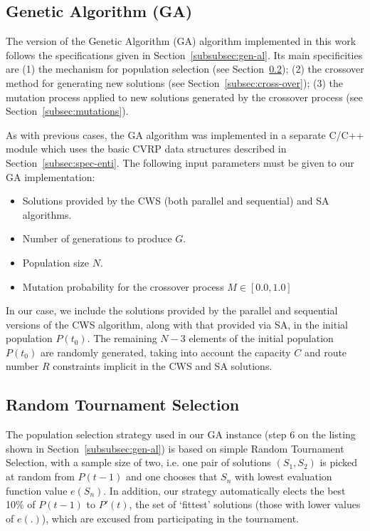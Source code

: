 \subsection{Genetic Algorithm (GA)}
\label{subsec:ga}

The version of the Genetic Algorithm (GA) algorithm implemented in this work 
follows the specifications given in Section~\ref{subsubsec:gen-al}. Its main 
specificities are (1) the mechanism for 
population selection (see Section~\ref{subsec:random-tournament}); (2) the 
crossover method for generating new solutions (see 
Section~\ref{subsec:cross-over}); (3) the mutation process applied to 
new solutions generated by the crossover process (see 
Section~\ref{subsec:mutations}).\vertbreak

As with previous cases, the GA algorithm was implemented in a separate 
C\slash C++ module which uses the basic CVRP data structures described in 
Section~\ref{subsec:spec-enti}. The following input 
parameters must be given to our GA implementation:

\begin{itemize}
    \item Solutions provided by the CWS (both parallel and sequential) and SA 
            algorithms.
    \item Number of generations to produce $G$.
    \item Population size $N$.
    \item Mutation probability for the crossover process $M \in [0.0, 1.0]$
\end{itemize}\vertbreak

In our case, we include the solutions provided 
by the parallel and sequential versions of the CWS algorithm, along with that 
provided via SA, in the initial population $P(t_0)$. The remaining $N - 3$ 
elements of the initial population $P(t_0)$ are randomly generated, taking into 
account the capacity $C$ and route number $R$ constraints implicit in the CWS and 
SA solutions.

\subsection{Random Tournament Selection}
\label{subsec:random-tournament}

The population selection strategy used in our GA instance (step 6 on the listing 
shown in Section~\ref{subsubsec:gen-al}) is based on simple 
Random Tournament Selection, with a sample size of two, i.e. one pair of 
solutions $(S_1,S_2)$ is picked at random from $P(t - 1)$ and one chooses that 
$S_n$ with lowest evaluation function value $e(S_n)$. In addition, our strategy 
automatically elects the best 10\% of $P(t - 1)$ to $P'(t)$, the set of `fittest' 
solutions (those with lower values of $e(.)$), which are excused from 
participating in the tournament.\vertbreak 

